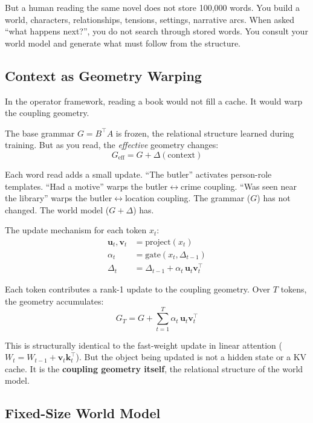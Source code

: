 \documentclass[11pt, a4paper]{article}
\theoremstyle{plain}
\theoremstyle{definition}
\theoremstyle{remark}
\begin{document}
But a human reading the same novel does not store 100,000 words.
You build a world, characters, relationships, tensions, settings, narrative arcs.
When asked ``what happens next?'', you do not search through stored words.
You consult your world model and generate what must follow from the structure.

\subsection{Context as Geometry Warping}

In the operator framework, reading a book would not fill a cache.
It would warp the coupling geometry.

The base grammar $G = B^\top A$ is frozen, the relational structure learned during training.
But as you read, the \emph{effective} geometry changes:
\begin{equation}
G_{\mathrm{eff}} = G + \Delta(\text{context})
\end{equation}

Each word read adds a small update.
``The butler'' activates person-role templates.
``Had a motive'' warps the butler$\leftrightarrow$crime coupling.
``Was seen near the library'' warps the butler$\leftrightarrow$location coupling.
The grammar ($G$) has not changed.
The world model ($G + \Delta$) has.

The update mechanism for each token $x_t$:
\begin{align}
\mathbf{u}_t, \mathbf{v}_t &= \text{project}(x_t) \\
\alpha_t &= \text{gate}(x_t, \Delta_{t-1}) \\
\Delta_t &= \Delta_{t-1} + \alpha_t \, \mathbf{u}_t \mathbf{v}_t^\top
\end{align}

Each token contributes a rank-1 update to the coupling geometry.
Over $T$ tokens, the geometry accumulates:
\begin{equation}
G_T = G + \sum_{t=1}^{T} \alpha_t \, \mathbf{u}_t \mathbf{v}_t^\top
\end{equation}

This is structurally identical to the fast-weight update in linear attention ($W_t = W_{t-1} + \mathbf{v}_t \mathbf{k}_t^\top$).
But the object being updated is not a hidden state or a KV cache.
It is the \textbf{coupling geometry itself}, the relational structure of the world model.

\subsection{Fixed-Size World Model}
\end{document}

